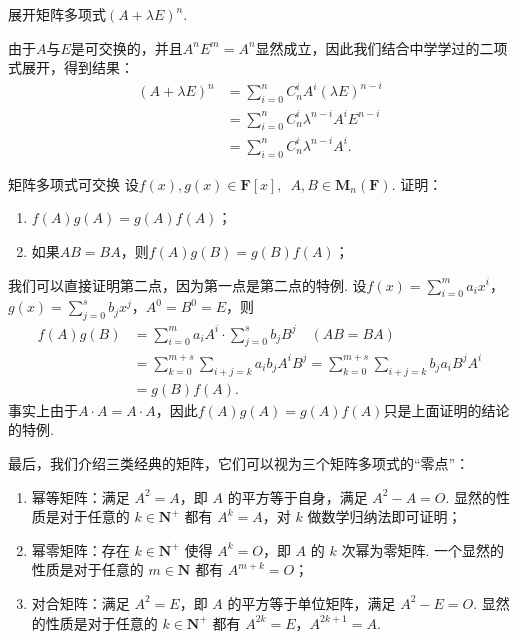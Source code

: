 \begin{example}{}{}
    展开矩阵多项式$(A+\lambda E)^n$.
\end{example}

\begin{solution}
    由于$A$与$E$是可交换的，并且$A^nE^m=A^n$显然成立，因此我们结合中学学过的二项式展开，得到结果：
    \begin{align*}
        (A+\lambda E)^n & =\sum_{i=0}^nC_n^iA^i(\lambda E)^{n-i}    \\
                        & =\sum_{i=0}^nC_n^i\lambda^{n-i}A^iE^{n-i} \\
                        & =\sum_{i=0}^nC_n^i\lambda^{n-i}A^i.
    \end{align*}
\end{solution}

\begin{example}{}{矩阵多项式可交换}
    设$f(x),g(x) \in \mathbf{F}[x],\enspace A,B \in \mathbf{M}_n(\mathbf{F})$. 证明：
    \begin{enumerate}
        \item $f(A)g(A)=g(A)f(A)$；

        \item 如果$AB=BA$，则$f(A)g(B)=g(B)f(A)$；
    \end{enumerate}
\end{example}

\begin{solution}
    我们可以直接证明第二点，因为第一点是第二点的特例. 设$f(x)=\displaystyle\sum_{i=0}^ma_ix^i$，$g(x)=\displaystyle\sum_{j=0}^sb_jx^j$，$A^0=B^0=E$，则
    \begin{align*}
        f(A)g(B) & =\sum_{i=0}^ma_iA^i\cdot \sum_{j=0}^sb_jB^j\quad(AB=BA)                            \\
                 & =\sum_{k=0}^{m+s}\sum_{i+j=k}a_ib_jA^iB^j=\sum_{k=0}^{m+s}\sum_{i+j=k}b_ja_iB^jA^i \\
                 & =g(B)f(A).
    \end{align*}
    事实上由于$A\cdot A=A\cdot A$，因此$f(A)g(A)=g(A)f(A)$只是上面证明的结论的特例.
\end{solution}

最后，我们介绍三类经典的矩阵，它们可以视为三个矩阵多项式的``零点''：
\begin{enumerate}
    \item 幂等矩阵：满足 $A^2 = A$，即 $A$ 的平方等于自身，满足 $A^2 - A = O$. 显然的性质是对于任意的 $k \in \mathbf{N}^+$ 都有 $A^k = A$，对 $k$ 做数学归纳法即可证明；
    \item 幂零矩阵：存在 $k \in \mathbf{N}^+$ 使得 $A^k = O$，即 $A$ 的 $k$ 次幂为零矩阵. 一个显然的性质是对于任意的 $m \in \mathbf{N}$ 都有 $A^{m+k} = O$；
    \item 对合矩阵：满足 $A^2 = E$，即 $A$ 的平方等于单位矩阵，满足 $A^2 - E = O$. 显然的性质是对于任意的 $k \in \mathbf{N}^+$ 都有 $A^{2k} = E$，$A^{2k+1} = A$.
\end{enumerate}

